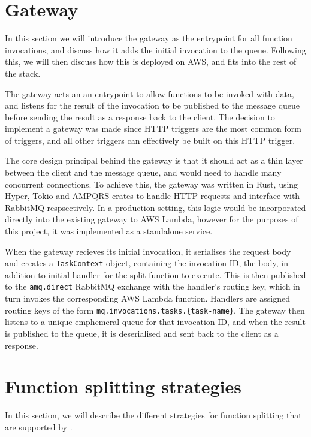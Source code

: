 \section{Gateway}
In this section we will introduce the gateway as the entrypoint for all function invocations, and discuss how it adds the initial invocation to the queue. Following this, we will then discuss how this is deployed on AWS, and fits into the rest of the stack.

The gateway acts an an entrypoint to allow functions to be invoked with data, and listens for the result of the invocation to be published to the message queue before sending the result as a response back to the client. The decision to implement a gateway was made since HTTP triggers are the most common form of triggers\cite{eismannReviewServerlessUse2020}, and all other triggers can effectively be built on this HTTP trigger.

The core design principal behind the gateway is that it should act as a thin layer between the client and the message queue, and would need to handle many concurrent connections. To achieve this, the gateway was written in Rust, using Hyper, Tokio and AMPQRS crates to handle HTTP requests and interface with RabbitMQ respsectively. In a production setting, this logic would be incorporated directly into the existing gateway to AWS Lambda, however for the purposes of this project, it was implemented as a standalone service.

When the gateway recieves its initial invocation, it serialises the request body and creates a \verb|TaskContext| object, containing the invocation ID, the body, in addition to initial handler for the split function to execute. This is then published to the \verb|amq.direct| RabbitMQ exchange with the handler's routing key, which in turn invokes the corresponding AWS Lambda function. Handlers are assigned routing keys of the form \verb|mq.invocations.tasks.{task-name}|. The gateway then listens to a unique emphemeral queue for that invocation ID, and when the result is published to the queue, it is deserialised and sent back to the client as a response.

\section{Function splitting strategies}
\label{sec:faas-function-splitting-strategies}
In this section, we will describe the different strategies for function splitting that are supported by \faaas{}.


